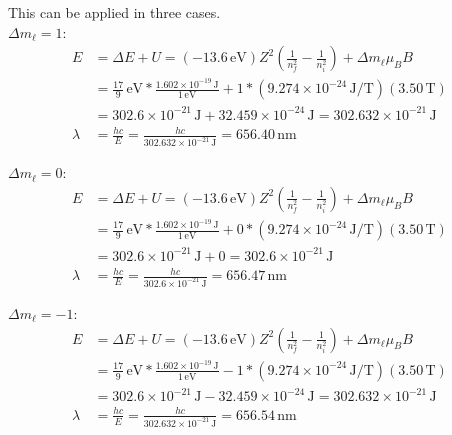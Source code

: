 \documentclass[12pt]{article}
\newcommand{\E}[1]{\times 10^{#1}}
\begin{document}
                This can be applied in three cases.\\
                $\Delta m_\ell = 1$:
                \begin{align}
                    E   &=  \Delta E + U
                        =   (-13.6\,\unit{\eV}) Z^2 \left( \frac{1}{n_f^2} - \frac{1}{n_i^2} \right) + \Delta m_\ell \mu_B B\\
                        &=  \frac{17}{9}\,\unit{\eV} * \frac{1.602\E{-19}\,\unit{\joule}}{1\,\unit{\eV}} + 1 * (9.274\E{-24}\,\unit{\joule/\tesla}) (3.50\,\unit{\tesla})\\
                        &=  302.6\E{-21}\,\unit{\joule} + 32.459\E{-24}\,\unit{\joule}
                        =   302.632\E{-21}\,\unit{\joule}\\
                    \lambda &=  \frac{hc}{E}
                        =   \frac{hc}{302.632\E{-21}\,\unit{\joule}}
                        =   \boxed{656.40\,\unit{\nano\meter}}
                \end{align}

                $\Delta m_\ell = 0$:
                \begin{align}
                    E   &=  \Delta E + U
                        =   (-13.6\,\unit{\eV}) Z^2 \left( \frac{1}{n_f^2} - \frac{1}{n_i^2} \right) + \Delta m_\ell \mu_B B\\
                        &=  \frac{17}{9}\,\unit{\eV} * \frac{1.602\E{-19}\,\unit{\joule}}{1\,\unit{\eV}} + 0 * (9.274\E{-24}\,\unit{\joule/\tesla}) (3.50\,\unit{\tesla})\\
                        &=  302.6\E{-21}\,\unit{\joule} + 0
                        =   302.6\E{-21}\,\unit{\joule}\\
                    \lambda &=  \frac{hc}{E}
                        =   \frac{hc}{302.6\E{-21}\,\unit{\joule}}
                        =   \boxed{656.47\,\unit{\nano\meter}}
                \end{align}

                $\Delta m_\ell = -1$:
                \begin{align}
                    E   &=  \Delta E + U
                        =   (-13.6\,\unit{\eV}) Z^2 \left( \frac{1}{n_f^2} - \frac{1}{n_i^2} \right) + \Delta m_\ell \mu_B B\\
                        &=  \frac{17}{9}\,\unit{\eV} * \frac{1.602\E{-19}\,\unit{\joule}}{1\,\unit{\eV}} - 1 * (9.274\E{-24}\,\unit{\joule/\tesla}) (3.50\,\unit{\tesla})\\
                        &=  302.6\E{-21}\,\unit{\joule} - 32.459\E{-24}\,\unit{\joule}
                        =   302.632\E{-21}\,\unit{\joule}\\
                    \lambda &=  \frac{hc}{E}
                        =   \frac{hc}{302.632\E{-21}\,\unit{\joule}}
                        =   \boxed{656.54\,\unit{\nano\meter}}
                \end{align}
            \pagebreak
\end{document}
